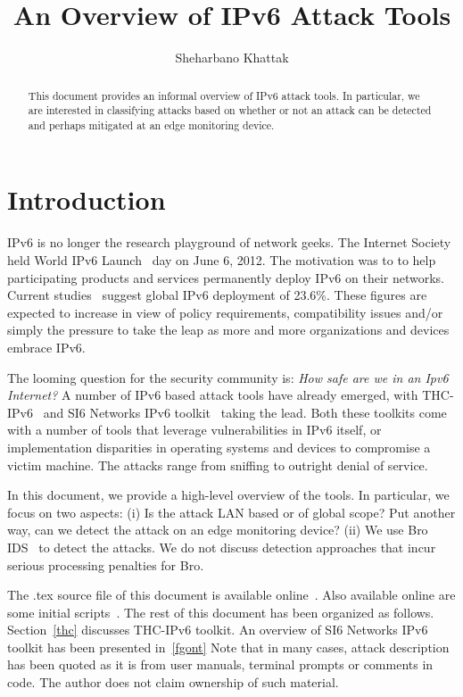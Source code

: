 \documentclass{article}
\begin{document}
\title{An Overview of IPv6 Attack Tools}
\author{Sheharbano Khattak}

\maketitle

\begin{abstract}
This document provides an informal overview of IPv6 attack tools. 
In particular, we are interested in classifying attacks based on
	whether or not an attack can be detected and perhaps mitigated at
	an edge monitoring device. 
\end{abstract}

\section{Introduction}
IPv6 is no longer the research playground of network geeks.
The Internet Society held World IPv6 Launch~\cite{world-ipv6-day} day on June 6, 2012.
The motivation was to to help participating products and services permanently deploy IPv6
	on their networks.
Current studies~\cite{eggert} suggest global IPv6 deployment of 23.6\%.  	
These figures are expected to increase in view of policy requirements,
	compatibility issues and/or simply the pressure to take the leap as 
	more and more organizations and devices embrace IPv6.

The looming question for the security community is:
	\emph{How safe are we in an Ipv6 Internet?}
A number of IPv6 based attack tools have already emerged, with
	THC-IPv6~\cite{thc} and SI6 Networks IPv6 toolkit~\cite{fgont} 
	taking the lead.  	
Both these toolkits come with a  number of tools that leverage
	vulnerabilities in IPv6 itself, or implementation disparities in
	operating systems and devices to compromise a victim machine.
The attacks range from sniffing to outright denial of service.
 	
In this document, we provide a high-level overview of the tools.
In particular, we focus on two aspects:
	(i) Is the attack LAN based or of global scope? Put another way,
	can we detect the attack on an edge monitoring device?
	(ii) We use Bro IDS~\cite{bro-ids} to detect the attacks.
		We do not discuss detection approaches that incur serious 
		processing penalties for Bro.    

The .tex source file of this document is available online~\cite{sb-ipv6}.
Also available online are some initial scripts~\cite{sb-dns}.
The rest of this document has been organized as follows.
Section~\ref{thc} discusses THC-IPv6 toolkit.
An overview of SI6 Networks IPv6 toolkit has been presented in~\ref{fgont} 		
Note that in many cases, attack description has been 
	quoted as it is from user manuals, terminal prompts
	or comments in code.	
The author does not claim ownership of such material.	
	
\end{document}
